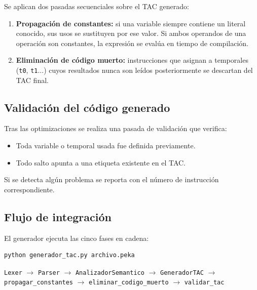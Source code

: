 \documentclass[12pt]{article}
\begin{document}
Se aplican dos pasadas secuenciales sobre el TAC generado:

\begin{enumerate}
    \item \textbf{Propagación de constantes:} si una variable
          siempre contiene un literal conocido, sus usos se
          sustituyen por ese valor. Si ambos operandos de una
          operación son constantes, la expresión se evalúa en
          tiempo de compilación.

    \item \textbf{Eliminación de código muerto:} instrucciones
          que asignan a temporales (\texttt{t0}, \texttt{t1}$\ldots$)
          cuyos resultados nunca son leídos posteriormente
          se descartan del TAC final.
\end{enumerate}

\subsection{Validación del código generado}

Tras las optimizaciones se realiza una pasada de validación que
verifica:

\begin{itemize}
    \item Toda variable o temporal usada fue definida previamente.
    \item Todo salto apunta a una etiqueta existente en el TAC.
\end{itemize}

Si se detecta algún problema se reporta con el número de
instrucción correspondiente.

\subsection{Flujo de integración}

El generador ejecuta las cinco fases en cadena:

\begin{lstlisting}[language=bash,
    caption={Ejecución del generador TAC}]
python generador_tac.py archivo.peka
\end{lstlisting}

\noindent
\texttt{Lexer} $\to$ \texttt{Parser} $\to$
\texttt{AnalizadorSemantico} $\to$ \texttt{GeneradorTAC}
$\to$ \texttt{propagar\_constantes} $\to$
\texttt{eliminar\_codigo\_muerto} $\to$ \texttt{validar\_tac}
\end{document}
